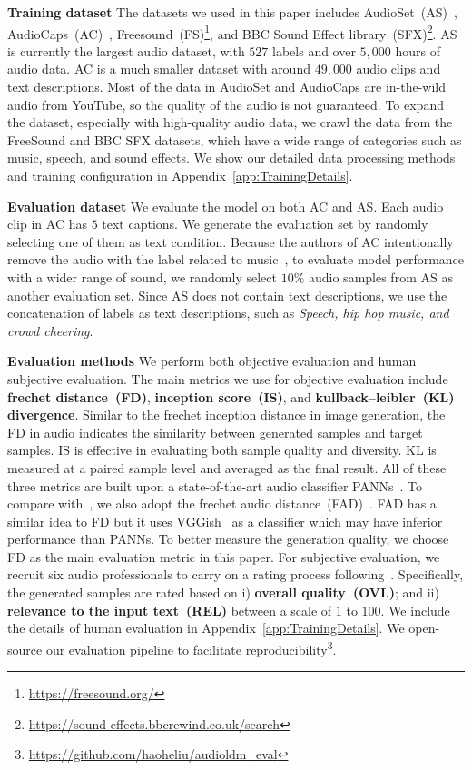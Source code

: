 \textbf{Training dataset} The datasets we used in this paper includes AudioSet~(AS)~\cite{gemmeke2017audio}, AudioCaps~(AC)~\cite{kim2019audiocaps}, Freesound~(FS)\footnote{\url{https://freesound.org/}}, and BBC Sound Effect library~(SFX)\footnote{\url{https://sound-effects.bbcrewind.co.uk/search}}. AS is currently the largest audio dataset, with $527$ labels and over $5,000$ hours of audio data. AC is a much smaller dataset with around $49,000$ audio clips and text descriptions. Most of the data in AudioSet and AudioCaps are in-the-wild audio from YouTube, so the quality of the audio is not guaranteed. To expand the dataset, especially with high-quality audio data, we crawl the data from the FreeSound and BBC SFX datasets, which have a wide range of categories such as music, speech, and sound effects. We show our detailed data processing methods and training configuration in Appendix~\ref{app:TrainingDetails}.

\textbf{Evaluation dataset} We evaluate the model on both AC and AS. Each audio clip in AC has $5$ text captions. We generate the evaluation set by randomly selecting one of them as text condition. Because the authors of AC intentionally remove the audio with the label related to music~\cite{kim2019audiocaps}, to evaluate model performance with a wider range of sound, we randomly select $10\%$ audio samples from AS as another evaluation set. Since AS does not contain text descriptions, we use the concatenation of labels as text descriptions, such as \textit{Speech, hip hop music, and crowd cheering}. 

\textbf{Evaluation methods} We perform both objective evaluation and human subjective evaluation. The main metrics we use for objective evaluation include \textbf{frechet distance~(FD)}, \textbf{inception score~(IS)}, and \textbf{kullback–leibler~(KL) divergence}. Similar to the frechet inception distance in image generation, the FD in audio indicates the similarity between generated samples and target samples. IS is effective in evaluating both sample quality and diversity. KL is measured at a paired sample level and averaged as the final result. All of these three metrics are built upon a state-of-the-art audio classifier PANNs~\cite{kong2020panns}. To compare with~\cite{kreuk2022audiogen}, we also adopt the frechet audio distance~(FAD)~\cite{kilgour2019frechet}. FAD has a similar idea to FD but it uses VGGish~\cite{vggish_hershey2017cnn} as a classifier which may have inferior performance than PANNs. To better measure the generation quality, we choose FD as the main evaluation metric in this paper. For subjective evaluation, we recruit six audio professionals to carry on a rating process following~\cite{kreuk2022audiogen,yang2022diffsound}. Specifically, the generated samples are rated based on i) \textbf{overall quality~(OVL)}; and ii) \textbf{relevance to the input text~(REL)} between a scale of $1$ to $100$. We include the details of human evaluation in Appendix~\ref{app:TrainingDetails}. We open-source our evaluation pipeline to facilitate reproducibility\footnote{\url{https://github.com/haoheliu/audioldm_eval}}.

